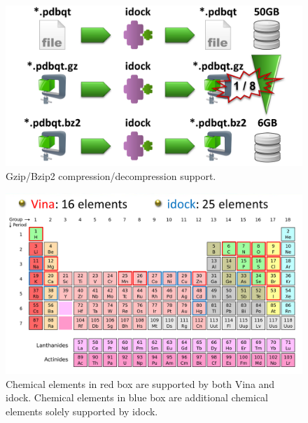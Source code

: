 \documentclass[12pt]{article}
\begin{document}
\clearpage

\begin{figure}
\begin{center}
\includegraphics[width=\linewidth]{Compression.png}
\caption{Gzip/Bzip2 compression/decompression support.}
\label{Compression}
\end{center}
\end{figure}

\clearpage

\begin{figure}
\begin{center}
\includegraphics[width=\linewidth]{ChemicalElements.png}
\caption{Chemical elements in red box are supported by both Vina and idock. Chemical elements in blue box are additional chemical elements solely supported by idock.}
\label{ChemicalElements}
\end{center}
\end{figure}

\clearpage
\end{document}
